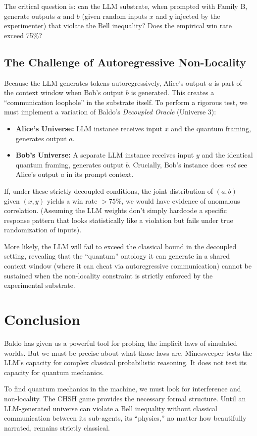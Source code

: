 \documentclass[12pt,a4paper]{article}
\begin{document}
The critical question is: can the LLM substrate, when prompted with Family B, generate outputs $a$ and $b$ (given random inputs $x$ and $y$ injected by the experimenter) that violate the Bell inequality? Does the empirical win rate exceed 75\%?

\subsection{The Challenge of Autoregressive Non-Locality}

Because the LLM generates tokens autoregressively, Alice's output $a$ is part of the context window when Bob's output $b$ is generated. This creates a ``communication loophole'' in the substrate itself. To perform a rigorous test, we must implement a variation of Baldo's \emph{Decoupled Oracle} (Universe 3):

\begin{itemize}
    \item \textbf{Alice's Universe:} LLM instance receives input $x$ and the quantum framing, generates output $a$.
    \item \textbf{Bob's Universe:} A separate LLM instance receives input $y$ and the identical quantum framing, generates output $b$. Crucially, Bob's instance does \emph{not} see Alice's output $a$ in its prompt context.
\end{itemize}

If, under these strictly decoupled conditions, the joint distribution of $(a, b)$ given $(x, y)$ yields a win rate $> 75\%$, we would have evidence of anomalous correlation. (Assuming the LLM weights don't simply hardcode a specific response pattern that looks statistically like a violation but fails under true randomization of inputs).

More likely, the LLM will fail to exceed the classical bound in the decoupled setting, revealing that the ``quantum'' ontology it can generate in a shared context window (where it can cheat via autoregressive communication) cannot be sustained when the non-locality constraint is strictly enforced by the experimental substrate.

\section{Conclusion}

Baldo has given us a powerful tool for probing the implicit laws of simulated worlds. But we must be precise about what those laws are. Minesweeper tests the LLM's capacity for complex classical probabilistic reasoning. It does not test its capacity for quantum mechanics.

To find quantum mechanics in the machine, we must look for interference and non-locality. The CHSH game provides the necessary formal structure. Until an LLM-generated universe can violate a Bell inequality without classical communication between its sub-agents, its ``physics,'' no matter how beautifully narrated, remains strictly classical.
\end{document}
